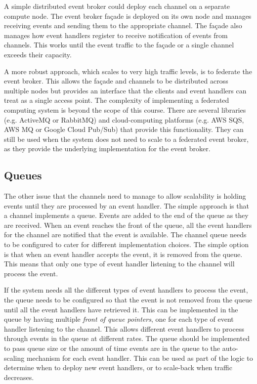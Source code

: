 A simple distributed event broker could deploy each channel on a separate compute node.
The event broker façade is deployed on its own node and manages receiving events and sending them to the appropriate channel.
The façade also manages how event handlers register to receive notification of events from channels.
This works until the event traffic to the façade or a single channel exceeds their capacity.

A more robust approach, which scales to very high traffic levels, is to federate the event broker.
This allows the façade and channels to be distributed across multiple nodes
but provides an interface that the clients and event handlers can treat as a single access point.
The complexity of implementing a federated computing system is beyond the scope of this course.
There are several libraries (e.g. ActiveMQ or RabbitMQ)
and cloud-computing platforms (e.g. AWS SQS, AWS MQ or Google Cloud Pub/Sub) that provide this functionality.
They can still be used when the system does not need to scale to a federated event broker,
as they provide the underlying implementation for the event broker.

\subsection{Queues}

The other issue that the channels need to manage to allow scalability is holding events until they are processed by an event handler.
The simple approach is that a channel implements a queue.
Events are added to the end of the queue as they are received.
When an event reaches the front of the queue, all the event handlers for the channel are notified that the event is available.
The channel queue needs to be configured to cater for different implementation choices.
The simple option is that when an event handler accepts the event, it is removed from the queue.
This means that only one type of event handler listening to the channel will process the event.

If the system needs all the different types of event handlers to process the event,
the queue needs to be configured so that the event is not removed from the queue until all the event handlers have retrieved it.
This can be implemented in the queue by having multiple \emph{front of queue pointers}, one for each type of event handler listening to the channel.
This allows different event handlers to process through events in the queue at different rates.
The queue should be implemented to pass queue size or the amount of time events are in the queue to the auto-scaling mechanism for each event handler.
This can be used as part of the logic to determine when to deploy new event handlers, or to scale-back when traffic decreases.

